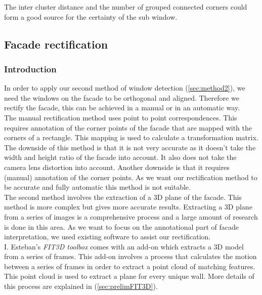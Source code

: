 The inter cluster
distance and the number of grouped connected corners could form a good source for
the certainty of the sub window.\\







\subsection{Facade rectification}
\subsubsection{Introduction}
In order to apply our second method of window detection (\ref{sec:method2}),
we need the windows on the facade to be orthogonal and aligned.
Therefore we rectify the facade, this can be achieved in a manual or in an automatic way.\\

The manual rectification method uses point to point correspondences. This 
requires annotation of the corner points of the facade that are mapped with the
corners of a rectangle. This mapping is used to calculate a transformation matrix. 
 The downside of this method is that it is not very accurate as it doesn't take
 the width and height ratio of the facade into account.
It also does not take the camera lens distortion into account.
 Another downside is that it requires (manual) annotation of the corner points.
As we want our rectification method to be accurate and fully automatic this
method is not suitable.\\

The second method involves the extraction of a 3D plane of the facade.  This
method is more complex but gives more accurate results.  Extracting a 3D plane
from a series of images is a comprehensive process and a large amount of
research is done in this area.  As we want to focus on the annotational part of
facade interpretation, we used existing software to assist our rectification.\\

I. Esteban's \emph{FIT3D toolbox} \cite{FIT3D} comes with an add-on which
extracts a 3D model from a series of frames.  This add-on involves a process
that calculates the motion between a series of frames in order to extract a point
cloud of matching features. This point cloud is used to extract a plane for
every unique wall.  More details of this process are explained in
(\ref{sec:prelimFIT3D}).

